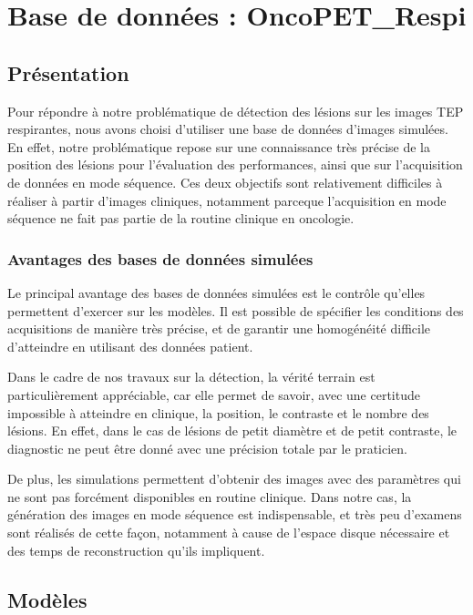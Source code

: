 \chapter{Base de données : OncoPET\_Respi}
	\label{lab:bdd}

\section{Présentation}

Pour répondre à notre problématique de détection des lésions sur les images TEP respirantes, nous avons choisi d’utiliser une base de données d’images simulées. En effet, notre problématique repose sur une connaissance très précise de la position des lésions pour l’évaluation des performances, ainsi que sur l’acquisition de données en mode séquence. Ces deux objectifs sont relativement difficiles à réaliser à partir d’images cliniques, notamment parceque l'acquisition en mode séquence ne fait pas partie de la routine clinique en oncologie.

	\subsection{Avantages des bases de données simulées}

Le principal avantage des bases de données simulées est le contrôle qu'elles permettent d'exercer sur les modèles. Il est possible de spécifier les conditions des acquisitions de manière très précise, et de garantir une homogénéité difficile d'atteindre en utilisant des données patient.

Dans le cadre de nos travaux sur la détection, la vérité terrain est particulièrement appréciable, car elle permet de savoir, avec une certitude impossible à atteindre en clinique, la position, le contraste et le nombre des lésions. En effet, dans le cas de lésions de petit diamètre et de petit contraste, le diagnostic ne peut être donné avec une précision totale par le praticien. 

De plus, les simulations permettent d’obtenir des images avec des paramètres qui ne sont pas forcément disponibles en routine clinique. Dans notre cas, la génération des images en mode séquence est indispensable, et très peu d’examens sont réalisés de cette façon, notamment à cause de l’espace disque nécessaire et des temps de reconstruction qu'ils impliquent.

	\section{Modèles}


